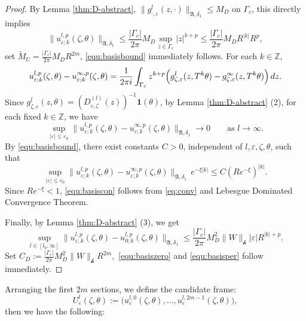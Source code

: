 \documentclass[reqno,11pt]{amsart}
\newcommand{\Z}{{\mathbb Z}}
\begin{document}
\begin{proof}
By Lemma \ref{thm:D-abstract},   $\|g^{l}_{\cdot,\varepsilon}(z,\cdot)\|_{\mathfrak A,\delta_1} \le M_D$ on $\Gamma_c$, this directly implies
\begin{equation*}
\|u^{l,p}_{\varepsilon;k}(\zeta,\theta)\|_{\mathfrak A,\delta_1}
\le\frac{|\Gamma_c|}{2\pi}M_D
\sup_{z\in\Gamma_c}|z|^{k+p}
\le \frac{|\Gamma_c|}{2\pi}M_D R^{|k|}R^p,
\end{equation*}
set $\tilde  M_U=\frac{|\Gamma_c|}{2\pi}M_DR^{2m}$, \eqref{equ:basisbound} immediately follows.
For each $k\in\Z$,
$$
u_{\varepsilon;k}^{l,p}(\zeta,\theta)-u_{\varepsilon;k}^{\infty,p}(\zeta,\theta)
=\frac{1}{2\pi i}\int_{\Gamma_c}
z^{k+p}\Bigl(
g_{\zeta,\varepsilon}^{l}(z,T^k \theta)-
g_{\zeta,\varepsilon}^{\infty}(z,T^k \theta)
\Bigr)\,dz.
$$
Since  $g_{\zeta,\varepsilon}^{l}(z,\theta)=(D_{\varepsilon,\zeta}^{(l)}(z))^{-1}\mathbf{1}(\theta)$, by Lemma \ref{thm:D-abstract} (2), for each fixed $k\in\Z$, we have 
\begin{equation}\label{eq:conv}
    \sup_{|\varepsilon|\le \varepsilon_0}
\|u_{\varepsilon;k}^{l,p}(\zeta,\theta)-u_{\varepsilon;k}^{\infty,p}(\zeta,\theta)\|_{\mathfrak A,\delta_1}\to 0
\qquad\text{as }l\to\infty.
\end{equation}
By \eqref{equ:basisbound}, there exist constants
$C>0$, independent of $l,\varepsilon,\zeta,\theta$, such that
$$
\sup_{|\varepsilon|\le \varepsilon_0}
\|u_{\varepsilon;k}^{l,p}(\zeta,\theta)-u_{\varepsilon;k}^{\infty,p}(\zeta,\theta)\|_{\mathfrak A,\delta_1}
\,e^{-\xi|k|}\le
C(Re^{-\xi})^{|k|}.
$$
Since $Re^{-\xi}<1$, \eqref{equ:basiscon} follows from \eqref{eq:conv} and  Lebesgue Dominated Convergence Theorem.


Finally, by Lemma \ref{thm:D-abstract} (3), 
we get
$$
 \sup_{l \in [l_0, \infty]}\|u_{\varepsilon;k}^{l,p}(\zeta,\theta)-
u_{0;k}^{l,p}(\zeta,\theta)\|_{\mathfrak A,\delta_1}
\le\frac{|\Gamma_c|}{2\pi}M_D^2\|W\|_\mathcal{h} |\varepsilon|R^{|k|+p}.
$$
Set
$
C_D:=\frac{|\Gamma_c|}{2\pi}M_D^2\|W\|_\mathcal{h}R^{2m},
$ \eqref{equ:basiszero} and \eqref{equ:basisper}  follow immediately.
\end{proof}


Arranging the first $2m$ sections, we define the candidate frame:
\begin{equation}\label{equ:basis}
    U^{l}_{\varepsilon}(\zeta,\theta):=\bigl(
u^{l,0}_{\varepsilon}(\zeta,\theta),\dots,
u^{l,2m-1}_{\varepsilon}(\zeta,\theta)\bigr),
\end{equation}
then we have the following:
\end{document}
